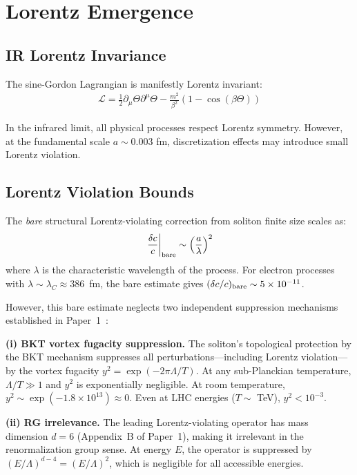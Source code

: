 ﻿\documentclass[twocolumn,showpacs,preprintnumbers,amsmath,amssymb,prd]{revtex4-2}
\begin{document}
\section{Lorentz Emergence}

\subsection{IR Lorentz Invariance}

The sine-Gordon Lagrangian is manifestly Lorentz invariant:
\begin{align}
\mathcal{L} = \frac{1}{2}\partial_\mu \Theta \partial^\mu \Theta - \frac{m^2}{\beta^2}(1 - \cos(\beta\Theta))
\end{align}

In the infrared limit, all physical processes respect Lorentz symmetry. However, at the fundamental scale $a \sim 0.003$ fm, discretization effects may introduce small Lorentz violation.

\subsection{Lorentz Violation Bounds}

The \emph{bare} structural Lorentz-violating correction from soliton finite size scales as:
\begin{align}
\left.\frac{\delta c}{c}\right|_{\rm bare} \sim \left(\frac{a}{\lambda}\right)^2
\end{align}
where $\lambda$ is the characteristic wavelength of the process.
For electron processes with $\lambda \sim \lambda_C \approx 386$~fm,
the bare estimate gives $(\delta c/c)_{\rm bare} \sim 5 \times 10^{-11}$.

However, this bare estimate neglects two independent suppression mechanisms
established in Paper~1~\cite{Paper1}:

\textbf{(i) BKT vortex fugacity suppression.}
The soliton's topological protection by the BKT mechanism
suppresses all perturbations---including Lorentz violation---by
the vortex fugacity $y^2 = \exp(-2\pi \Lambda/T)$.
At any sub-Planckian temperature, $\Lambda/T \gg 1$ and $y^2$
is exponentially negligible. At room temperature,
$y^2 \sim \exp(-1.8 \times 10^{13}) \approx 0$.
Even at LHC energies ($T \sim$ TeV), $y^2 < 10^{-3}$.

\textbf{(ii) RG irrelevance.}
The leading Lorentz-violating operator has mass dimension $d=6$
(Appendix~B of Paper~1), making it irrelevant in the renormalization
group sense. At energy $E$, the operator is suppressed by
$(E/\Lambda)^{d-4} = (E/\Lambda)^2$, which is negligible for all
accessible energies.
\end{document}
